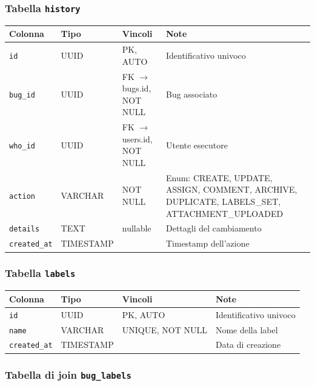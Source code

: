 \subsubsection{Tabella \texttt{history}}

\begin{center}
\small
\begin{tabular}{|l|l|l|p{4cm}|}
\hline
\textbf{Colonna} & \textbf{Tipo} & \textbf{Vincoli} & \textbf{Note} \\
\hline
\texttt{id} & UUID & PK, AUTO & Identificativo univoco \\
\hline
\texttt{bug\_id} & UUID & FK $\rightarrow$ bugs.id, NOT NULL & Bug associato \\
\hline
\texttt{who\_id} & UUID & FK $\rightarrow$ users.id, NOT NULL & Utente esecutore \\
\hline
\texttt{action} & VARCHAR & NOT NULL & Enum: CREATE, UPDATE, ASSIGN, COMMENT, ARCHIVE, DUPLICATE, LABELS\_SET, ATTACHMENT\_UPLOADED \\
\hline
\texttt{details} & TEXT & nullable & Dettagli del cambiamento \\
\hline
\texttt{created\_at} & TIMESTAMP & & Timestamp dell'azione \\
\hline
\end{tabular}
\end{center}

\subsubsection{Tabella \texttt{labels}}

\begin{center}
\small
\begin{tabular}{|l|l|l|p{4cm}|}
\hline
\textbf{Colonna} & \textbf{Tipo} & \textbf{Vincoli} & \textbf{Note} \\
\hline
\texttt{id} & UUID & PK, AUTO & Identificativo univoco \\
\hline
\texttt{name} & VARCHAR & UNIQUE, NOT NULL & Nome della label \\
\hline
\texttt{created\_at} & TIMESTAMP & & Data di creazione \\
\hline
\end{tabular}
\end{center}

\subsubsection{Tabella di join \texttt{bug\_labels}}

